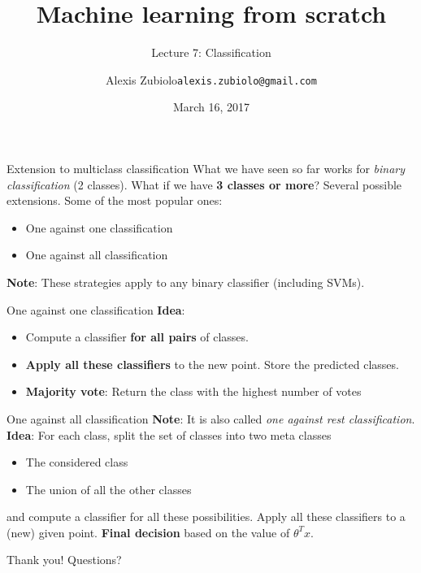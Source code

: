 \documentclass{beamer}
\title{Machine learning from scratch}
\subtitle{Lecture 7: Classification}
\author{Alexis Zubiolo\newline\texttt{alexis.zubiolo@gmail.com}}
\institute{Data Science Team Lead @ Adcash}
\date{March 16, 2017}
\newcommand{\1}[1]{\mathbbm{1}\left[#1\right]}
\begin{document}
\begin{frame}
  \titlepage
\end{frame}

\begin{frame}{Extension to multiclass classification}
\vfill
What we have seen so far works for \textit{binary classification} (2 classes). What if we have \textbf{3 classes or more}?
\vfill
\pause 
Several possible extensions. Some of the most popular ones:
\begin{itemize}
	\item One against one classification
	\item One against all classification
\end{itemize}
\vfill
\textbf{Note}: These strategies apply to any binary classifier (including SVMs).
\vfill
\end{frame}
%
\begin{frame}{One against one classification}
\textbf{Idea}: 
\begin{itemize}
	\item Compute a classifier \textbf{for all pairs} of classes.
	\item \textbf{Apply all these classifiers} to the new point. Store the predicted classes.
	\item \textbf{Majority vote}: Return the class with the highest number of votes
\end{itemize}

\end{frame}
%
\begin{frame}{One against all classification}
\vfill
\textbf{Note}: It is also called \textit{one against rest classification}.
\vfill
\textbf{Idea}: For each class, split the set of classes into two meta classes
\begin{itemize}
	\item The considered class
	\item The union of all the other classes
\end{itemize}
and compute a classifier for all these possibilities.
Apply all these classifiers to a (new) given point.
\vfill
\textbf{Final decision} based on the value of $\theta^T x$.
\end{frame}

\begin{frame}
\begin{center}
\Huge{Thank you! Questions?}
\end{center}
\end{frame}
\end{document}
